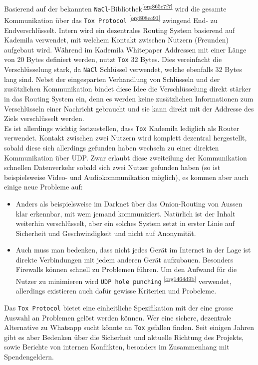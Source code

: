 \documentclass[a4paper,11pt,titlepage,twoside]{memoir}
\begin{document}
\noindent Basierend auf der bekannten \texttt{NaCl}-Bibliothek\textsuperscript{\ref{org865c7f7}} wird die
gesamte Kommunikation über das \texttt{Tox Protocol} \textsuperscript{\ref{org808ec91}} zwingend End- zu
Endverschlüsselt. Intern wird ein dezentrales Routing System basierend
auf Kademila verwendet, mit welchem Kontakt zwischen Nutzern
(Freunden) aufgebaut wird. Während im Kademila Whitepaper Addressen
mit einer Länge von 20 Bytes definiert werden, nutzt \texttt{Tox} 32 Bytes.
Dies vereinfacht die Verschlüsselung stark, da \texttt{NaCl} Schlüssel
verwendet, welche ebenfalls 32 Bytes lang sind. Nebst der eingesparten
Verhandlung von Schlüsseln und der zusätzlichen Kommunikation bindet
diese Idee die Verschlüsselung direkt stärker in das Routing System
ein, denn es werden keine zusätzlichen Informationen zum Verschlüsseln
einer Nachricht gebraucht und sie kann direkt mit der Addresse des
Ziels verschlüsselt werden.\\

\noindent Es ist allerdings wichtig festzustellen, dass \texttt{Tox} Kademila
lediglich als Router verwendet. Kontakt zwischen zwei Nutzern wird
komplett dezentral hergestellt, sobald diese sich allerdings gefunden
haben wechseln zu einer direkten Kommunikation über UDP. Zwar erlaubt
diese zweiteilung der Kommunikation schnellen Datenverkehr sobald sich
zwei Nutzer gefunden haben (so ist beispielsweise Video- und
Audiokommunikation möglich), es kommen aber auch einige neue Probleme
auf:
\begin{itemize}
\item Anders als beispielsweise im Darknet über das Onion-Routing von
Aussen klar erkennbar, mit wem jemand kommuniziert. Natürlich ist
der Inhalt weiterhin verschlüsselt, aber ein solches System setzt in
erster Linie auf Sicherheit und Geschwindigkeit und nicht auf
Anonymität.
\item Auch muss man bedenken, dass nicht jedes Gerät im Internet in der
Lage ist direkte Verbindungen mit jedem anderen Gerät aufzubauen.
Besonders Firewalls können schnell zu Problemen führen. Um den
Aufwand für die Nutzer zu minimieren wird \texttt{UDP hole punching} \textsuperscript{\ref{org1464d9b}}
verwendet, allerdings existieren auch dafür gewisse Kriterien und
Probeleme.
\end{itemize}

\noindent Das \texttt{Tox Protocol} bietet eine einheitliche Spezifikation mit
der eine grosse Auswahl an Problemen gelöst werden können. Wer eine
sichere, dezentrale Alternative zu Whatsapp sucht könnte an \texttt{Tox}
gefallen finden. Seit einigen Jahren gibt es aber Bedenken über die
Sicherheit und aktuelle Richtung des Projekts, sowie Berichte von
internen Konflikten, besonders im Zusammenhang mit Spendengeldern.
\end{document}
